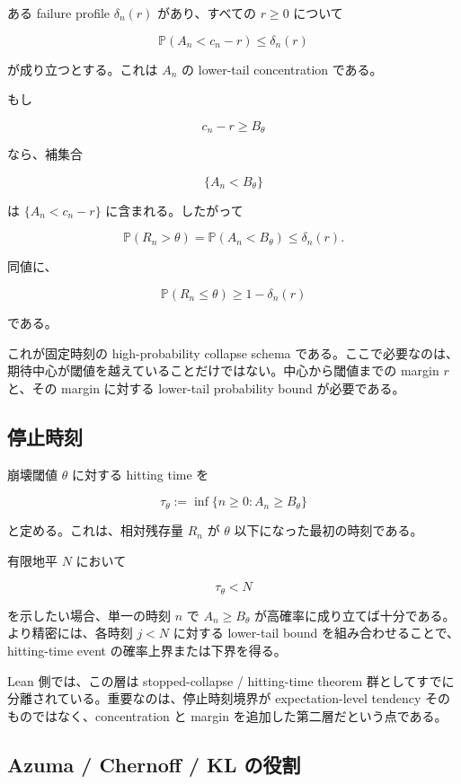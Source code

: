 \documentclass[12pt,a4paper]{article}
\begin{document}
ある failure profile \(\delta_{n}(r)\) があり、すべての \(r\ge 0\) について

\[
\mathbb P(A_{n} < c_{n}-r) \le \delta_{n}(r)
\]

が成り立つとする。これは \(A_{n}\) の lower-tail concentration である。

もし

\[
c_{n}-r \ge B_\theta
\]

なら、補集合

\[
\{A_{n} < B_\theta\}
\]

は \(\{A_{n} < c_{n}-r\}\) に含まれる。したがって

\[
\mathbb P(R_{n} > \theta) = \mathbb P(A_{n} < B_\theta) \le \delta_{n}(r).
\]

同値に、

\[
\mathbb P(R_{n} \le \theta) \ge 1-\delta_{n}(r)
\]

である。

これが固定時刻の high-probability collapse schema である。ここで必要なのは、期待中心が閾値を越えていることだけではない。中心から閾値までの margin \(r\) と、その margin に対する lower-tail probability bound が必要である。

\subsection{停止時刻}\label{ux505cux6b62ux6642ux523b}

崩壊閾値 \(\theta\) に対する hitting time を

\[
\tau_\theta := \inf\{n \ge 0 : A_{n} \ge B_\theta\}
\]

と定める。これは、相対残存量 \(R_{n}\) が \(\theta\) 以下になった最初の時刻である。

有限地平 \(N\) において

\[
\tau_\theta < N
\]

を示したい場合、単一の時刻 \(n\) で \(A_{n}\ge B_\theta\) が高確率に成り立てば十分である。より精密には、各時刻 \(j<N\) に対する lower-tail bound を組み合わせることで、hitting-time event の確率上界または下界を得る。

Lean 側では、この層は stopped-collapse / hitting-time theorem 群としてすでに分離されている。重要なのは、停止時刻境界が expectation-level tendency そのものではなく、concentration と margin を追加した第二層だという点である。

\subsection{Azuma / Chernoff / KL の役割}\label{azuma-chernoff-kl-ux306eux5f79ux5272}
\end{document}
